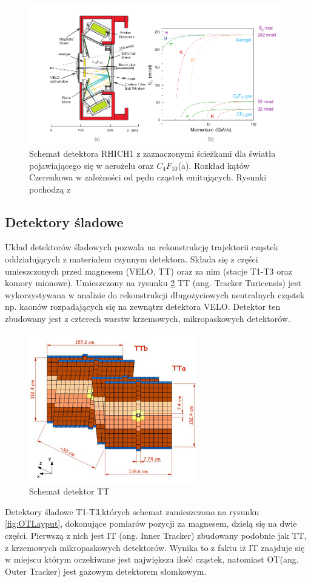 \begin{figure}[th]
  \centering
  \includegraphics[scale=0.5]{rozdzial2/RICH.png}
  \caption{Schemat detektora RHICH1	z zaznaczonymi ścieżkami dla światła pojawiającego się w aerożelu oraz $C_4F_{10}$(a). Rozkład kątów Czerenkowa w zależności od pędu cząstek emitujących. Rysunki pochodzą z  \cite{public}}
  \label{fig:RICH}
\end{figure}


\subsection{Detektory śladowe}
Układ detektorów śladowych pozwala na rekonstrukcję trajektorii cząstek oddziałujących z materiałem czynnym detektora. Składa się z części umieszczonych przed magnesem (VELO, TT) oraz za nim (stacje T1-T3 oraz komory mionowe). Umieszczony na rysunku \ref{fig:TTlayout} TT (ang. Tracker Turicensis) jest wykorzystywana w analizie do rekonstrukcji długożyciowych neutralnych cząstek np. kaonów rozpadających się na zewnątrz detektora VELO. Detektor ten zbudowany jest z czterech warstw krzemowych, mikropaskowych detektorów. 
\begin{figure}[H]
  \centering
  \includegraphics[scale=1]{rozdzial2/TT-layout.jpg}
  \caption{Schemat detektor TT \cite{public}}
  \label{fig:TTlayout}
\end{figure}
Detektory śladowe T1-T3,których schemat zamieszczono na rysunku \ref{fig:OTLayput},  dokonujące pomiarów pozycji za magnesem, dzielą się na dwie części. Pierwszą z nich jest IT (ang. Inner Tracker) zbudowany podobnie jak TT, z krzemowych mikropaskowych detektorów. Wynika to z faktu iż IT znajduje się w miejscu którym oczekiwane jest największa ilość cząstek, natomiast OT(ang. Outer Tracker) jest gazowym detektorem słomkowym.

